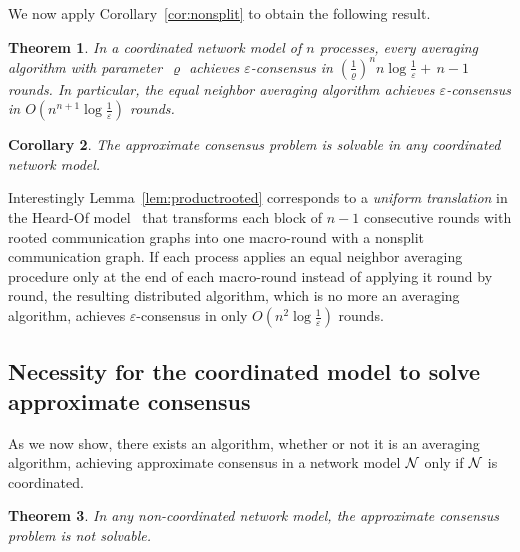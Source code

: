 \documentclass[a4paper]{article}
\theoremstyle{newthm}
\newtheorem{thm}{Theorem}
\newtheorem{cor}[thm]{Corollary}
\begin{document}
We now apply Corollary~\ref{cor:nonsplit} to obtain  the following result.

\begin{thm}\label{thm:coord}
In a coordinated network model of $n$ processes, every averaging algorithm with parameter~$\varrho$
	achieves $\varepsilon$-consensus in 
	$ \left (\frac{1 }{\varrho}\right )^{n} n \log \frac{1}{\varepsilon}  + \, n -1 $ rounds.
In particular, the equal neighbor averaging algorithm achieves $\varepsilon$-consensus in 
	$O \left ( n ^{n  + 1} \log \frac{1}{\varepsilon} \right )$ rounds. 
\end{thm}

\begin{cor}\label{cor:solvac}
The approximate consensus problem is solvable in any coordinated network model.
\end{cor}

Interestingly Lemma~\ref{lem:productrooted} corresponds to a {\em uniform translation} in the
	Heard-Of model~\cite{CS09} that transforms  each block of $n-1$ consecutive rounds with
	rooted communication graphs into one  macro-round with a  nonsplit  communication graph.
If each process applies an equal neighbor averaging procedure only at the end of each macro-round instead of
	applying it round by round, the resulting distributed algorithm, which is no more an averaging 
	algorithm, achieves $\varepsilon$-consensus in only
	$ O \left ( n ^{2} \log \frac{1}{\varepsilon} \right ) $ rounds.
	 
\subsection{Necessity for the coordinated model to solve approximate consensus}

As we now show, there exists an algorithm, whether or not it is an averaging algorithm, achieving
	approximate consensus in  a network model ${\cal N}$ only if  ${\cal N}$ is coordinated.

\begin{thm}\label{thm:noncoord}
In any non-coordinated network model, the approximate consensus problem is not solvable.  
\end{thm}
\end{document}
